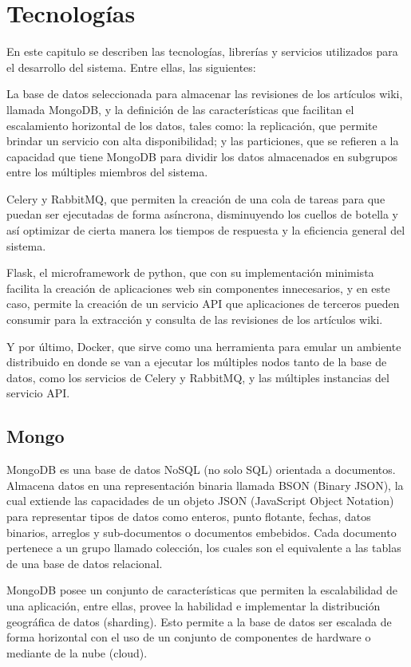 \section{Tecnologías}

En este capitulo se describen las tecnologías, librerías y servicios utilizados para el desarrollo
del sistema. Entre ellas, las siguientes:

La base de datos seleccionada para almacenar las revisiones de los artículos wiki, llamada MongoDB,
y la definición de las características que facilitan el escalamiento horizontal de los datos, tales como: la replicación,
que permite brindar un servicio con alta disponibilidad; y las particiones, que se refieren a la capacidad
que tiene MongoDB para dividir los datos almacenados en subgrupos entre los múltiples miembros del sistema.

Celery y RabbitMQ, que permiten la creación de una cola de tareas para que puedan ser ejecutadas de forma asíncrona,
disminuyendo los cuellos de botella y así optimizar de cierta manera los tiempos de respuesta y la eficiencia
general del sistema.

Flask, el microframework de python, que con su implementación minimista facilita la creación de aplicaciones web
sin componentes innecesarios, y en este caso, permite la creación de un servicio API que aplicaciones
de terceros pueden consumir para la extracción y consulta de las revisiones de los artículos wiki.

Y por último, Docker, que sirve como una herramienta para emular un ambiente distribuido en donde
se van a ejecutar los múltiples nodos tanto de la base de datos, como los servicios de Celery y RabbitMQ, y
las múltiples instancias del servicio API.

\subsection{Mongo}

MongoDB es una base de datos NoSQL (no solo SQL) orientada a documentos. Almacena
datos en una representación binaria llamada BSON (Binary JSON), la cual extiende
las capacidades de un objeto JSON (JavaScript Object Notation) para representar
tipos de datos como enteros, punto flotante, fechas, datos binarios, arreglos y sub-documentos o
documentos embebidos. Cada documento pertenece a un grupo llamado colección, los cuales son el
equivalente a las tablas de una base de datos relacional.

MongoDB posee un conjunto de  características que permiten la escalabilidad de una aplicación, entre ellas,
provee la habilidad e implementar la distribución geográfica de datos (sharding). Esto permite a la
base de datos ser escalada de forma horizontal con el uso de un conjunto de componentes de hardware o mediante
de la nube (cloud).

